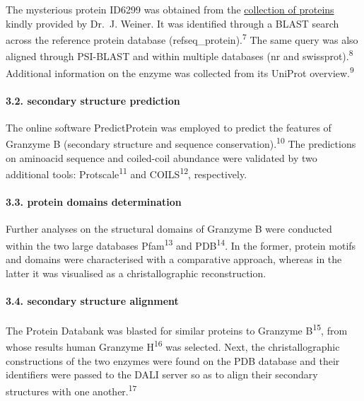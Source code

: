 \documentclass[
]{article}
\begin{document}
The mysterious protein ID6299 was obtained from the \href{https://github.com/january3/Bioinformatics/tree/main/Report/Sequences}{collection of proteins} kindly provided by Dr.~J. Weiner. It was identified through a BLAST search across the reference protein database (refseq\_protein).\textsuperscript{7} The same query was also aligned through PSI-BLAST and within multiple databases (nr and swissprot).\textsuperscript{8} Additional information on the enzyme was collected from its UniProt overview.\textsuperscript{9}

\hypertarget{secondary-structure-prediction}{%
\paragraph{3.2. secondary structure prediction}\label{secondary-structure-prediction}}

The online software PredictProtein was employed to predict the features of Granzyme B (secondary structure and sequence conservation).\textsuperscript{10} The predictions on aminoacid sequence and coiled-coil abundance were validated by two additional tools: Protscale\textsuperscript{11} and COILS\textsuperscript{12}, respectively.

\hypertarget{protein-domains-determination}{%
\paragraph{3.3. protein domains determination}\label{protein-domains-determination}}

Further analyses on the structural domains of Granzyme B were conducted within the two large databases Pfam\textsuperscript{13} and PDB\textsuperscript{14}. In the former, protein motifs and domains were characterised with a comparative approach, whereas in the latter it was visualised as a christallographic reconstruction.

\hypertarget{secondary-structure-alignment}{%
\paragraph{3.4. secondary structure alignment}\label{secondary-structure-alignment}}

The Protein Databank was blasted for similar proteins to Granzyme B\textsuperscript{15}, from whose results human Granzyme H\textsuperscript{16} was selected. Next, the christallographic constructions of the two enzymes were found on the PDB database and their identifiers were passed to the DALI server so as to align their secondary structures with one another.\textsuperscript{17}
\end{document}
